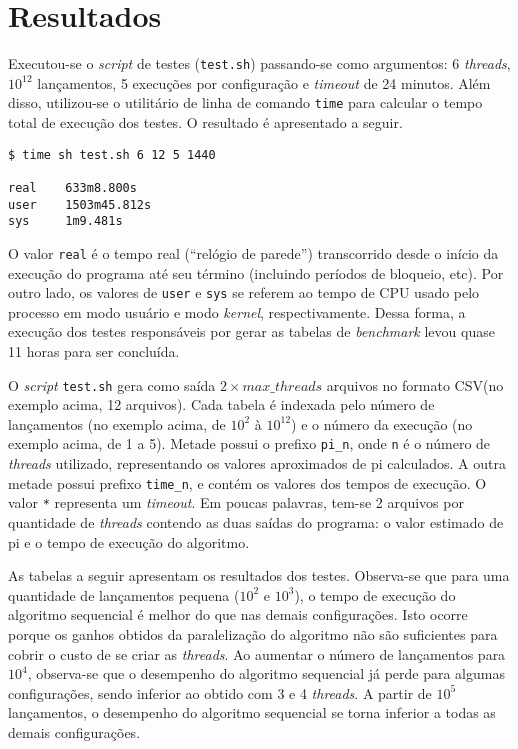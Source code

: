 \documentclass[12pt,a4paper]{article}
\begin{document}
\section{Resultados}
\label{sec:resultados}
Executou-se o \textit{script} de testes (\texttt{test.sh}) passando-se como
argumentos: 6 \textit{threads}, $10^{12}$ lançamentos, 5 execuções por
configuração e \textit{timeout} de 24 minutos. Além disso, utilizou-se o
utilitário de linha de comando \texttt{time} para calcular o tempo total de
execução dos testes. O resultado é apresentado a seguir.

\begin{verbatim}
$ time sh test.sh 6 12 5 1440

real    633m8.800s
user    1503m45.812s
sys     1m9.481s
\end{verbatim}

O valor \texttt{real} é o tempo real (``relógio de parede'') transcorrido desde
o início da execução do programa até seu término (incluindo períodos de
bloqueio, etc). Por outro lado, os valores de \texttt{user} e \texttt{sys} se
referem ao tempo de CPU usado pelo processo em modo usuário e modo
\textit{kernel}, respectivamente. Dessa forma, a execução dos testes
responsáveis por gerar as tabelas de \textit{benchmark} levou quase 11 horas
para ser concluída.

O \textit{script} \texttt{test.sh} gera como saída $2 \times max\_threads$
arquivos no formato CSV\@ (no exemplo acima, 12 arquivos). Cada tabela é
indexada pelo número de lançamentos (no exemplo acima, de $10^2$ à $10^{12}$) e
o número da execução (no exemplo acima, de 1 a 5).  Metade possui o prefixo
\texttt{pi\_{n}}, onde \texttt{n} é o número de \textit{threads} utilizado,
representando os valores aproximados de pi calculados. A outra metade possui
prefixo \texttt{time\_{n}}, e contém os valores dos tempos de execução. O valor
\texttt{*} representa um \textit{timeout}. Em poucas palavras, tem-se 2 arquivos
por quantidade de \textit{threads} contendo as duas saídas do programa: o valor
estimado de pi e o tempo de execução do algoritmo.

As tabelas a seguir apresentam os resultados dos testes. Observa-se que para uma
quantidade de lançamentos pequena ($10^2$ e $10^3$), o tempo de execução do
algoritmo sequencial é melhor do que nas demais configurações. Isto ocorre
porque os ganhos obtidos da paralelização do algoritmo não são suficientes para
cobrir o custo de se criar as \textit{threads}. Ao aumentar o número
de lançamentos para $10^4$, observa-se que o desempenho do algoritmo sequencial
já perde para algumas configurações, sendo inferior ao obtido com 3 e 4
\textit{threads}. A partir de $10^5$ lançamentos, o desempenho do algoritmo
sequencial se torna inferior a todas as demais configurações.
\end{document}
